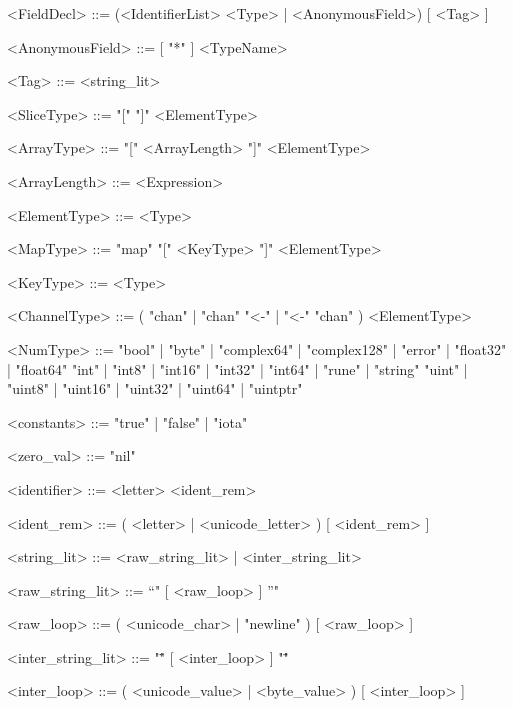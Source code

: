 \documentclass{article}
\begin{document}
\begin{grammar}
        <FieldDecl>         ::=     (<IdentifierList> <Type> | <AnonymousField>) [ <Tag> ]

        <AnonymousField>    ::=     [ "*" ] <TypeName>

        <Tag>               ::=     <string_lit>

        <SliceType>         ::=     "[" "]" <ElementType>

        <ArrayType>         ::=     "[" <ArrayLength> "]" <ElementType>

        <ArrayLength>       ::=     <Expression>

        <ElementType>       ::=     <Type>

        <MapType>           ::=     "map" "[" <KeyType> "]" <ElementType>

        <KeyType>           ::=     <Type>

        <ChannelType>       ::= ( "chan" | "chan" "<-" | "<-" "chan" ) <ElementType> 

        <NumType>           ::=     "bool" | "byte" | "complex64" | "complex128" | "error" | "float32" | "float64"
	                        \alt    "int" | "int8" | "int16" | "int32" | "int64" | "rune" | "string"
                            \alt    "uint" | "uint8" | "uint16" | "uint32" | "uint64" | "uintptr"

        <constants>         ::=     "true" | "false" | "iota"

        <zero_val>          ::=     "nil" 
        

        <identifier>    ::= <letter> <ident_rem>
        
        <ident_rem>     ::= ( <letter> | <unicode_letter> ) [ <ident_rem> ]


        <string_lit>        ::=     <raw_string_lit> | <inter_string_lit>

        <raw_string_lit>    ::=     "`" [ <raw_loop> ] "'"

        <raw_loop>          ::=     ( <unicode_char> | "newline" ) [ <raw_loop> ] 

        <inter_string_lit>  ::=     "\"" [ <inter_loop> ] "\""

        <inter_loop>        ::=     ( <unicode_value> | <byte_value> ) [ <inter_loop> ]


\end{grammar}
\end{document}
